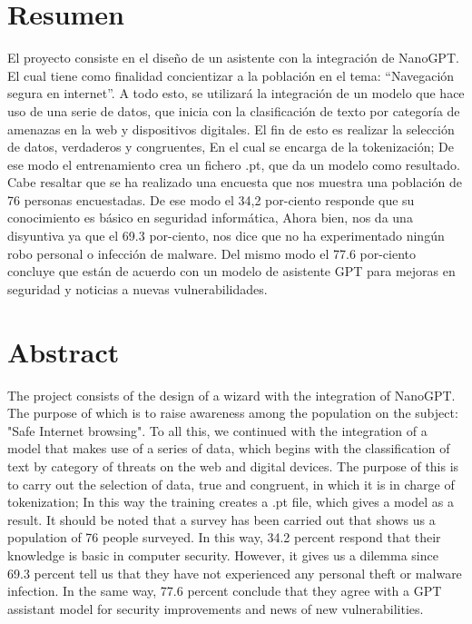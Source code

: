 \documentclass[12pt,letterpaper,fleqn]{report}
\begin{document}
\chapter*{Resumen}
El proyecto consiste en el diseño de un asistente con la integración de NanoGPT.
El cual tiene como finalidad concientizar a la población en el tema: “Navegación segura en internet”. 
A todo esto, se utilizará la integración de un modelo que hace uso de una serie de datos, que inicia con la clasificación de texto por categoría de amenazas en la web y dispositivos digitales. El fin de esto es realizar la selección de datos, verdaderos y congruentes, En el cual se encarga de la tokenización; De ese modo el entrenamiento crea un fichero .pt, que da un modelo como resultado. Cabe resaltar que se ha realizado una encuesta que nos muestra una población de 76 personas encuestadas. De ese modo el 34,2 por-ciento responde que su conocimiento es básico en seguridad informática, Ahora bien, nos da una disyuntiva ya que el 69.3 por-ciento, nos dice que no ha experimentado ningún robo personal o infección de malware. Del mismo modo el 77.6 por-ciento concluye que están de acuerdo con un modelo de asistente GPT para mejoras en seguridad y noticias a nuevas vulnerabilidades.

 \cleardoublepage
\chapter*{Abstract}
 The project consists of the design of a wizard with the integration of NanoGPT.
The purpose of which is to raise awareness among the population on the subject: "Safe Internet browsing".
To all this, we continued with the integration of a model that makes use of a series of data, which begins with the classification of text by category of threats on the web and digital devices. The purpose of this is to carry out the selection of data, true and congruent, in which it is in charge of tokenization; In this way the training creates a .pt file, which gives a model as a result. It should be noted that a survey has been carried out that shows us a population of 76 people surveyed. In this way, 34.2 percent respond that their knowledge is basic in computer security. However, it gives us a dilemma since 69.3 percent tell us that they have not experienced any personal theft or malware infection. In the same way, 77.6 percent conclude that they agree with a GPT assistant model for security improvements and news of new vulnerabilities.
\end{document}
